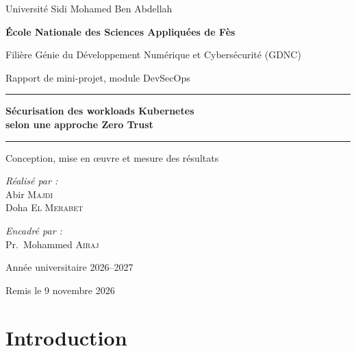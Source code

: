 \documentclass[11pt,a4paper]{article}
\newcommand{\encadrant}{Pr.~Mohammed \textsc{Airaj}}
\begin{document}
\begin{titlepage}
\centering
{\large Université Sidi Mohamed Ben Abdellah\par}
\vspace{0.2cm}
{\large\bfseries École Nationale des Sciences Appliquées de Fès\par}
\vspace{0.2cm}
{Filière Génie du Développement Numérique et Cybersécurité (GDNC)\par}
\vspace{2.8cm}
{\large Rapport de mini-projet, module DevSecOps\par}
\vspace{0.8cm}
\rule{\textwidth}{0.6pt}\par
\vspace{0.4cm}
{\LARGE\bfseries Sécurisation des workloads Kubernetes\\[0.25cm] selon une approche Zero Trust\par}
\vspace{0.4cm}
\rule{\textwidth}{0.6pt}\par
\vspace{0.6cm}
{\large Conception, mise en œuvre et mesure des résultats\par}
\vspace{3cm}
\begin{minipage}[t]{0.47\textwidth}
\raggedright
\textit{Réalisé par :}\\[0.2cm]
Abir \textsc{Majdi}\\
Doha \textsc{El Merabet}
\end{minipage}\hfill
\begin{minipage}[t]{0.47\textwidth}
\raggedleft
\textit{Encadré par :}\\[0.2cm]
\encadrant
\end{minipage}
\vfill
{Année universitaire 2026--2027\par}
\vspace{0.2cm}
{\small Remis le 9 novembre 2026\par}
\end{titlepage}

\tableofcontents
\newpage
{}

\section{Introduction}
\end{document}
